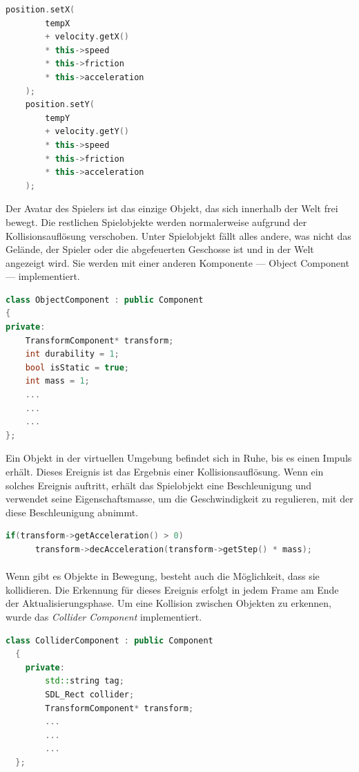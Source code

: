 \documentclass[
  10pt,
  a4paper,
  oneside,
  headers,
  headinclude,
  footinclude,
  BCOR5mm,
]{article}
\begin{document}
\begin{lstlisting}[language=C++]
    position.setX(
        tempX
        + velocity.getX()
        * this->speed
        * this->friction
        * this->acceleration
    );
    position.setY(
        tempY
        + velocity.getY()
        * this->speed
        * this->friction
        * this->acceleration
    );
\end{lstlisting}

Der Avatar des Spielers ist das einzige Objekt, das sich innerhalb der Welt frei
bewegt. Die restlichen Spielobjekte werden normalerweise aufgrund der
Kollisionsauflösung verschoben. Unter Spielobjekt fällt alles andere, was nicht
das Gelände, der Spieler oder die abgefeuerten Geschosse ist und in der Welt
angezeigt wird. Sie werden mit einer anderen Komponente --- Object Component
--- implementiert.

\begin{lstlisting}[language=C++]
class ObjectComponent : public Component
{
private:
    TransformComponent* transform;
    int durability = 1;
    bool isStatic = true;
    int mass = 1;
    ...
    ...
    ...
};
\end{lstlisting}

Ein Objekt in der virtuellen Umgebung befindet sich in Ruhe, bis es einen Impuls
erhält. Dieses Ereignis ist das Ergebnis einer Kollisionsauflösung. Wenn ein
solches Ereignis auftritt, erhält das Spielobjekt eine Beschleunigung und
verwendet seine Eigenschaftsmasse, um die Geschwindigkeit zu regulieren, mit der
diese Beschleunigung abnimmt.

\begin{lstlisting}[language=C++]
  if(transform->getAcceleration() > 0)
      transform->decAcceleration(transform->getStep() * mass);
\end{lstlisting}

\paragraph{}
Wenn gibt es Objekte in Bewegung, besteht auch die Möglichkeit, dass sie
kollidieren. Die Erkennung für dieses Ereignis erfolgt in jedem Frame am Ende
der Aktualisierungsphase. Um eine Kollision zwischen Objekten zu erkennen, wurde
das \textit{Collider Component} implementiert.

\begin{lstlisting}[language=C++]
  class ColliderComponent : public Component
  {
    private:
        std::string tag;
        SDL_Rect collider;
        TransformComponent* transform;
        ...
        ...
        ...
  };
\end{lstlisting}
\end{document}
